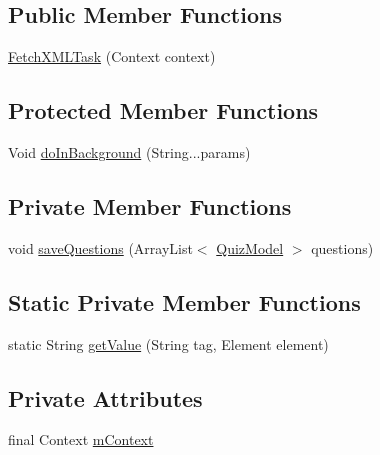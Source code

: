 \subsection*{Public Member Functions}
\begin{DoxyCompactItemize}
\item 
\hyperlink{classorg_1_1buildmlearn_1_1toolkit_1_1quiztemplate_1_1data_1_1FetchXMLTask_a9b410cfbe15125b31aa45791c52dbf79}{Fetch\+X\+M\+L\+Task} (Context context)
\end{DoxyCompactItemize}
\subsection*{Protected Member Functions}
\begin{DoxyCompactItemize}
\item 
Void \hyperlink{classorg_1_1buildmlearn_1_1toolkit_1_1quiztemplate_1_1data_1_1FetchXMLTask_abbed87c40bb473c1a73902393b3c2cbc}{do\+In\+Background} (String...\+params)
\end{DoxyCompactItemize}
\subsection*{Private Member Functions}
\begin{DoxyCompactItemize}
\item 
void \hyperlink{classorg_1_1buildmlearn_1_1toolkit_1_1quiztemplate_1_1data_1_1FetchXMLTask_a71f03e512bcc2796bdabe268aa587fd4}{save\+Questions} (Array\+List$<$ \hyperlink{classorg_1_1buildmlearn_1_1toolkit_1_1quiztemplate_1_1data_1_1QuizModel}{Quiz\+Model} $>$ questions)
\end{DoxyCompactItemize}
\subsection*{Static Private Member Functions}
\begin{DoxyCompactItemize}
\item 
static String \hyperlink{classorg_1_1buildmlearn_1_1toolkit_1_1quiztemplate_1_1data_1_1FetchXMLTask_aa0b9d990e3453470b74a9b989c07213a}{get\+Value} (String tag, Element element)
\end{DoxyCompactItemize}
\subsection*{Private Attributes}
\begin{DoxyCompactItemize}
\item 
final Context \hyperlink{classorg_1_1buildmlearn_1_1toolkit_1_1quiztemplate_1_1data_1_1FetchXMLTask_a15f89458c18114e937d50970fcf53402}{m\+Context}
\end{DoxyCompactItemize}


